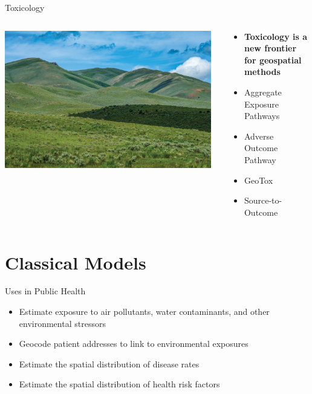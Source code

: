 \documentclass[
  ignorenonframetext,
]{beamer}
\begin{document}
\begin{frame}{Toxicology}
\label{toxicology}
\begin{columns}[T]
\begin{column}{0.5\textwidth}
\includegraphics[width=0.97\textwidth,height=\textheight]{../20240311_SOT_Meeting_Talk/PublicLands.jpeg}
\end{column}

\begin{column}{0.5\textwidth}
\begin{itemize}
\item
  \textbf{Toxicology is a new frontier for geospatial methods}
\item
  Aggregate Exposure Pathways
\item
  Adverse Outcome Pathway
\item
  GeoTox
\item
  Source-to-Outcome
\end{itemize}
\end{column}
\end{columns}
\end{frame}

\section{Classical Models}\label{classical-models}

\begin{frame}{Uses in Public Health}
\label{uses-in-public-health}
\begin{itemize}
\item
  Estimate exposure to air pollutants, water contaminants, and other
  environmental stressors
\item
  Geocode patient addresses to link to environmental exposures
\item
  Estimate the spatial distribution of disease rates
\item
  Estimate the spatial distribution of health risk factors
\end{itemize}
\end{frame}
\end{document}
